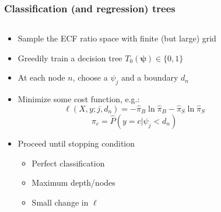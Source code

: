 \documentclass[aspectratio=169,xcolor=dvipsnames,,table,compress]{beamer}
\begin{document}
\begin{frame}[t]  \frametitle{Classification (and regression) trees}
  \vspace{-5mm}
  \begin{columns}[T]
    \begin{column}{0.66\textwidth}
      \begin{itemize}
        \item Sample the ECF ratio space with finite (but large) grid
        \item Greedily train a decision tree $T_0(\bm{\psi}) \in \{0,1\}$
        \item At each node $n$, choose a $\psi_j$ and a boundary $d_n$
        \item Minimize some cost function, e.g.:
        \[ \ell(X,y;j,d_n) =  -\hat\pi_B\ln\hat\pi_B -\hat\pi_S\ln\hat\pi_S \]
        \[\hat\pi_c = \hat P(y=c | \psi_j < d_n)\]
        \item Proceed until stopping condition
        \begin{itemize}
          \item Perfect classification
          \item Maximum depth/nodes
          \item Small change in $\ell$
        \end{itemize}
      \end{itemize}
    \end{column}
    \begin{column}{0.33\textwidth}

\end{column}
\end{columns}
\end{frame}
\end{document}
